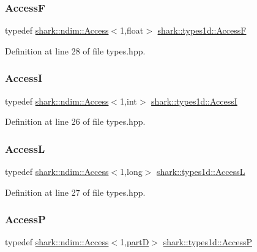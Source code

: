 \subsubsection{\texorpdfstring{AccessF}{AccessF}}
{\footnotesize\ttfamily typedef \hyperlink{classshark_1_1ndim_1_1_access}{shark\+::ndim\+::\+Access}$<$1,float$>$ \hyperlink{namespaceshark_1_1types1d_ab69cddb6d83ab9c0e5abe54e7bd70425}{shark\+::types1d\+::\+AccessF}}



Definition at line 28 of file types.\+hpp.

\hypertarget{namespaceshark_1_1types1d_a3e0ba1df1379dee1262f190172c0a19f}{}\label{namespaceshark_1_1types1d_a3e0ba1df1379dee1262f190172c0a19f} 
\subsubsection{\texorpdfstring{AccessI}{AccessI}}
{\footnotesize\ttfamily typedef \hyperlink{classshark_1_1ndim_1_1_access}{shark\+::ndim\+::\+Access}$<$1,int$>$ \hyperlink{namespaceshark_1_1types1d_a3e0ba1df1379dee1262f190172c0a19f}{shark\+::types1d\+::\+AccessI}}



Definition at line 26 of file types.\+hpp.

\hypertarget{namespaceshark_1_1types1d_af8a71c7ea6e215e49744784528a63d1e}{}\label{namespaceshark_1_1types1d_af8a71c7ea6e215e49744784528a63d1e} 
\subsubsection{\texorpdfstring{AccessL}{AccessL}}
{\footnotesize\ttfamily typedef \hyperlink{classshark_1_1ndim_1_1_access}{shark\+::ndim\+::\+Access}$<$1,long$>$ \hyperlink{namespaceshark_1_1types1d_af8a71c7ea6e215e49744784528a63d1e}{shark\+::types1d\+::\+AccessL}}



Definition at line 27 of file types.\+hpp.

\hypertarget{namespaceshark_1_1types1d_a22b84fc439e41258b86b79db74f90fd1}{}\label{namespaceshark_1_1types1d_a22b84fc439e41258b86b79db74f90fd1} 
\subsubsection{\texorpdfstring{AccessP}{AccessP}}
{\footnotesize\ttfamily typedef \hyperlink{classshark_1_1ndim_1_1_access}{shark\+::ndim\+::\+Access}$<$1,\hyperlink{namespaceshark_1_1types1d_a46775e0f758bf283c37ef3733ac9e294}{partD}$>$ \hyperlink{namespaceshark_1_1types1d_a22b84fc439e41258b86b79db74f90fd1}{shark\+::types1d\+::\+AccessP}}



